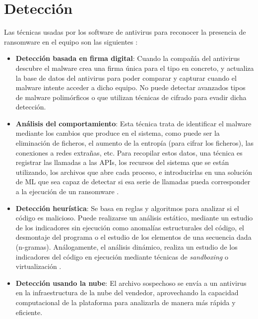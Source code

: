 \section{Detección}\label{sec:2-8}
\noindent Las técnicas usadas por los software de antivirus para reconocer la presencia de ransomware en el equipo son las siguientes \cite{ransommasive}:
\begin{itemize}
    \item \textbf{Detección basada en firma digital}: Cuando la compañía del antivirus descubre el malware crea una firma única para el tipo en concreto, y actualiza la base de datos del antivirus para poder comparar y capturar cuando el malware intente acceder a dicho equipo. No puede detectar avanzados tipos de malware polimórficos o que utilizan técnicas de cifrado para evadir dicha detección. 
    \item \textbf{Análisis del comportamiento}: Esta técnica trata de identificar el malware mediante los cambios que produce en el sistema, como puede ser la eliminación de ficheros, el aumento de la entropía (para cifrar los ficheros), las conexiones a redes extrañas, etc. Para recopilar estos datos, una técnica es registrar las llamadas a las \gls{API}s, los recursos del sistema que se están utilizando, los archivos que abre cada proceso, e introducirlas en una solución de \gls{ML} que sea capaz de detectar si esa serie de llamadas pueda corresponder a la ejecución de un ransomware \cite{Arabo2020}. 
    \item \textbf{Detección heurística}: Se basa en reglas y algoritmos para analizar si el código es malicioso. Puede realizarse un análisis estático, mediante un estudio de los indicadores sin ejecución como anomalías estructurales del código, el desmontaje del programa o el estudio de los elementos de una secuencia dada (n-gramas). Análogamente, el análisis dinámico, realiza un estudio de los indicadores del código en ejecución mediante técnicas de \textit{sandboxing} o virtualización \cite{DUBE2012137}. 
    \item \textbf{Detección usando la nube}: El archivo sospechoso se envía a un antivirus en la infraestructura de la nube del vendedor, aprovechando la capacidad computacional de la plataforma para analizarla de manera más rápida y eficiente. 
\end{itemize}

